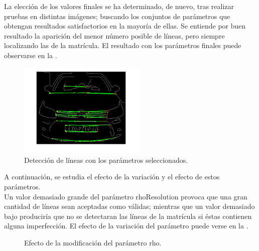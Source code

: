 La elección de los valores finales se ha determinado, de nuevo, tras realizar pruebas en distintas imágenes; buscando los conjuntos de parámetros que obtengan resultados satisfactorios en la mayoría de ellas. Se entiende por buen resultado la aparición del menor número posible de líneas, pero siempre localizando las de la matrícula. El resultado con los parámetros finales puede observarse en la .

\begin{figure}[!h]
\centering
\includegraphics[width=6cm]{EjemploHough.png}
\caption{\small{Detección de líneas con los parámetros seleccionados.}}
\label{Houghfinal}
\end{figure}

A continuación, se estudia el efecto de la variación y el efecto de estos parámetros.\\

Un valor demasiado grande del parámetro rhoResolution provoca que una gran cantidad de líneas sean aceptadas como válidas; mientras que un valor demasiado bajo produciría que no se detectaran las líneas de la matrícula si éstas contienen alguna imperfección. El efecto de la variación del parámetro puede verse en la . 

\begin{figure}[!h]
\centering {}
\caption{\small{Efecto de la modificación del parámetro rho.}} \label{cambiorho}
\end{figure} 

